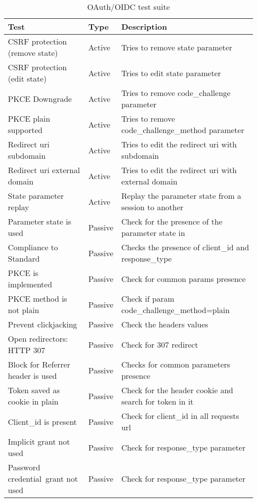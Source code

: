 \begin{table}[h]
    \begin{tabular}{|l|l|l|}
        \hline
        Test                                   & Type         & Description                             \\
        \hline\hline
        CSRF protection (remove state)          & Active        & Tries to remove state parameter \\
        CSRF protection (edit state)    &   Active  &   Tries to edit state parameter\\
        PKCE Downgrade                  &   Active  &   Tries to remove code\_challenge parameter \\
        PKCE plain supported            &   Active  &   Tries to remove code\_challenge\_method parameter \\
        Redirect uri subdomain          &   Active  &   Tries to edit the redirect uri with subdomain \\
        Redirect uri external domain    &   Active  &   Tries to edit the redirect uri with external domain \\
        State parameter replay          &   Active  &   Replay the parameter state from a session to another \\
        Parameter state is used         &   Passive  &   Check for the presence of the parameter state in \\
        Compliance to Standard          &   Passive  &   Checks the presence of client\_id and response\_type\\
        PKCE is implemented             &   Passive &   Check for common params presence \\
        PKCE method is not plain        &   Passive &   Check if param code\_challenge\_method=plain \\
        Prevent clickjacking            &   Passive &   Check the headers values \\
        Open redirectors: HTTP 307      &   Passive &   Check for 307 redirect \\
        Block for Referrer header is used  &    Passive &   Checks for common parameters presence \\
        Token saved as cookie in plain  &   Passive &   Check for the header cookie and search for token in it\\
        Client\_id is present            &   Passive &   Check for client\_id in all requests url \\
        Implicit grant not used         &   Passive &   Check for response\_type parameter \\ 
        Password credential\ grant not used  &   Passive &   Check for response\_type parameter \\

        \hline
    \end{tabular}
    \caption{\label{tab:OAuth_test_suite}OAuth/OIDC test suite}
\end{table}

